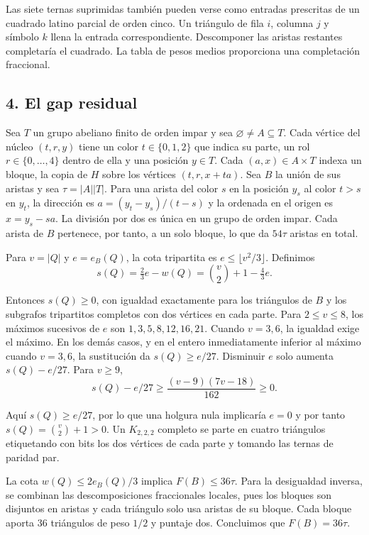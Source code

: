 \documentclass[spanish,11pt,a4paper]{article}
\begin{document}
Las siete ternas suprimidas también pueden verse como entradas prescritas de un cuadrado latino parcial de orden cinco. Un triángulo de fila \(i\), columna \(j\) y símbolo \(k\) llena la entrada correspondiente. Descomponer las aristas restantes completaría el cuadrado. La tabla de pesos medios proporciona una completación fraccional.

\subsection{4. El gap residual}\label{el-gap-residual}

Sea \(T\) un grupo abeliano finito de orden impar y sea \(\varnothing\ne A\subseteq T\). Cada vértice del núcleo \((t,r,y)\) tiene un color \(t\in\{0,1,2\}\) que indica su parte, un rol \(r\in\{0,\ldots,4\}\) dentro de ella y una posición \(y\in T\). Cada \((a,x)\in A\times T\) indexa un bloque, la copia de \(H\) sobre los vértices \((t,r,x+ta)\). Sea \(B\) la unión de sus aristas y sea \(\tau=|A||T|\). Para una arista del color \(s\) en la posición \(y_s\) al color \(t>s\) en \(y_t\), la dirección es \(a=(y_t-y_s)/(t-s)\) y la ordenada en el origen es \(x=y_s-sa\). La división por dos es única en un grupo de orden impar. Cada arista de \(B\) pertenece, por tanto, a un solo bloque, lo que da \(54\tau\) aristas en total.

Para \(v=|Q|\) y \(e=e_B(Q)\), la cota tripartita es \(e\le\lfloor v^2/3\rfloor\). Definimos
\[s(Q)=\tfrac23 e-w(Q)=\binom v2+1-\tfrac43e.\]

Entonces \(s(Q)\ge0\), con igualdad exactamente para los triángulos de \(B\) y los subgrafos tripartitos completos con dos vértices en cada parte. Para \(2\le v\le8\), los máximos sucesivos de \(e\) son \(1,3,5,8,12,16,21\). Cuando \(v=3,6\), la igualdad exige el máximo. En los demás casos, y en el entero inmediatamente inferior al máximo cuando \(v=3,6\), la sustitución da \(s(Q)\ge e/27\). Disminuir \(e\) solo aumenta \(s(Q)-e/27\). Para \(v\ge9\),
\[s(Q)-e/27\ge \frac{(v-9)(7v-18)}{162}\ge0.\]

Aquí \(s(Q)\ge e/27\), por lo que una holgura nula implicaría \(e=0\) y por tanto \(s(Q)=\binom v2+1>0\). Un \(K_{2,2,2}\) completo se parte en cuatro triángulos etiquetando con bits los dos vértices de cada parte y tomando las ternas de paridad par.

La cota \(w(Q)\le 2e_B(Q)/3\) implica \(F(B)\le36\tau\). Para la desigualdad inversa, se combinan las descomposiciones fraccionales locales, pues los bloques son disjuntos en aristas y cada triángulo solo usa aristas de su bloque. Cada bloque aporta 36 triángulos de peso \(1/2\) y puntaje dos. Concluimos que \(F(B)=36\tau\).
\end{document}

